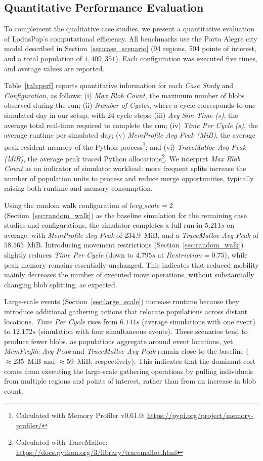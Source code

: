\documentclass[pdflatex,sn-mathphys-num]{sn-jnl}%
\newcommand\redc[1]{#1}
\theoremstyle{thmstyleone}%
\theoremstyle{thmstyletwo}%
\theoremstyle{thmstylethree}%
\begin{document}
\subsection{Quantitative Performance Evaluation}
\label{sec:quant_perf}

\redc{To complement the qualitative case studies, we present a quantitative evaluation of LodusPop’s computational efficiency. All benchmarks use the Porto Alegre city model described in Section~\ref{sec:case_scenario} (94 regions, 504 points of interest, and a total population of $1,409,351$). Each configuration was executed five times, and average values are reported.

Table~\ref{tab:perf} reports quantitative information for each \textit{Case Study} and \textit{Configuration}, as follows: (i) \textit{Max Blob Count}, the maximum number of blobs observed during the run; (ii) \textit{Number of Cycles}, where a cycle corresponds to one simulated day in our setup, with 24 cycle steps; (iii) \textit{Avg Sim Time (s)}, the average total real-time required to complete the run; (iv) \textit{Time Per Cycle (s)}, the average runtime per simulated day; (v) \textit{MemProfile Avg Peak (MiB)}, the average peak resident memory of the Python process\footnote{Calculated with Memory Profiler v0.61.0: \url{https://pypi.org/project/memory-profiler/}}; and (vi) \textit{TraceMalloc Avg Peak (MiB)}, the average peak traced Python allocations\footnote{Calculated with TraceMalloc: \url{https://docs.python.org/3/library/tracemalloc.html}}. We interpret \textit{Max Blob Count} as an indicator of simulator workload: more frequent splits increase the number of population units to process and reduce merge opportunities, typically raising both runtime and memory consumption.

Using the random walk configuration of $levy\_scale=2$ (Section~\ref{sec:random_walk}) as the baseline simulation for the remaining case studies and configurations, the simulator completes a full run in $5.211s$ on average, with \emph{MemProfile Avg Peak} of $234.9$~MiB, and a \textit{TraceMalloc Avg Peak} of $58.565$~MiB. Introducing movement restrictions (Section~\ref{sec:random_walk}) slightly reduces \textit{Time Per Cycle} (down to $4.795s$ at $Restriction =0.75$), while peak memory remains essentially unchanged. This indicates that reduced mobility mainly decreases the number of executed move operations, without substantially changing blob splitting, as expected.

Large-scale events (Section~\ref{sec:large_scale}) increase runtime because they introduce additional gathering actions that relocate populations across distant locations. \textit{Time Per Cycle} rises from $6.144s$ (average simulations with one event) to $12.172s$ (simulation with four simultaneous events). These scenarios tend to produce fewer blobs, as populations aggregate around event locations, yet \textit{MemProfile Avg Peak} and \textit{TraceMalloc Avg Peak} remain close to the baseline ($\approx 235$~MiB and $\approx 59$~MiB, respectively). This indicates that the dominant cost comes from executing the large-scale gathering operations by pulling individuals from multiple regions and points of interest, rather than from an increase in blob count.

}
\end{document}
